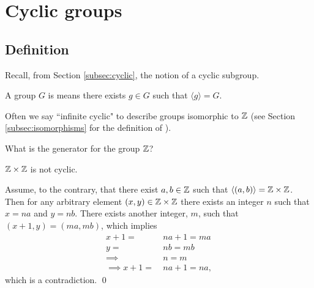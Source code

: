 \documentclass[../algebraNotesMSRI-UP2016.tex]{subfiles}
\begin{document}
\section[\S \thesection]{Cyclic groups}
\subsection[\subsecname]{Definition}\label{subsec:cyclicDefs}
\begin{frame}[c]{\subsecname}
Recall, from Section \ref{subsec:cyclic}, the notion of a cyclic subgroup.

\smallGap
\begin{dfn}
A group $G$ is  means there exists $g\in G$ such that $\langle g\rangle=G$.
\end{dfn}

\smallGap
\begin{ex}
Often we say ``infinite cyclic" to describe groups isomorphic to $\mathbb Z$ (see Section \ref{subsec:isomorphisms} for the definition of ).
\end{ex}

\smallGap
\begin{que}
What is the generator for the group $\mathbb Z$?
\end{que}
\end{frame}

\begin{frame}
\begin{ex}
$\mathbb Z\times\mathbb Z$ is not cyclic.  

\smallGap
\pf
Assume, to the contrary, that there exist $a,b\in\mathbb Z$ such that $\langle(a,b)\rangle=\mathbb Z\times\mathbb Z$.  Then for any arbitrary element $(x,y)\in\mathbb Z\times \mathbb Z$ there exists an integer $n$ such that $x=na$ and $y=nb$.  There exists another integer, $m$, such that $(x+1,y)=(ma,mb)$, which implies 
\begin{align*}
x+1 =&\ na+1 = ma \\
y =&\ nb = mb \\
\implies &\ n = m \\
\implies x+1 =&\ na+1=na,
\end{align*}
which is a contradiction.
\qed
\end{ex}
\end{frame}

\end{document}
